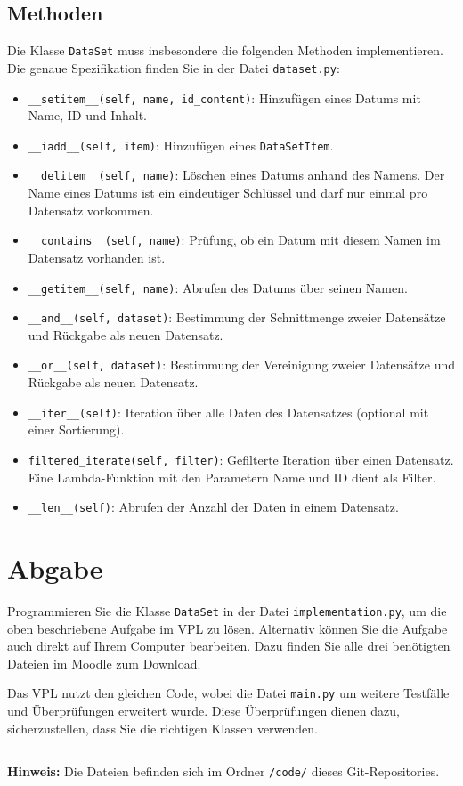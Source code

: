 \documentclass[12pt
a4paper,
parskip=full ]{article}
\begin{document}
\subsection{Methoden}
Die Klasse \texttt{DataSet} muss insbesondere die folgenden Methoden implementieren. Die genaue Spezifikation finden Sie in der Datei \texttt{dataset.py}:

\begin{itemize}
    \item \texttt{\_\_setitem\_\_(self, name, id\_content)}: Hinzuf\"ugen eines Datums mit Name, ID und Inhalt.
    \item \texttt{\_\_iadd\_\_(self, item)}: Hinzuf\"ugen eines \texttt{DataSetItem}.
    \item \texttt{\_\_delitem\_\_(self, name)}: L\"oschen eines Datums anhand des Namens. Der Name eines Datums ist ein eindeutiger Schl\"ussel und darf nur einmal pro Datensatz vorkommen.
    \item \texttt{\_\_contains\_\_(self, name)}: Pr\"ufung, ob ein Datum mit diesem Namen im Datensatz vorhanden ist.
    \item \texttt{\_\_getitem\_\_(self, name)}: Abrufen des Datums \"uber seinen Namen.
    \item \texttt{\_\_and\_\_(self, dataset)}: Bestimmung der Schnittmenge zweier Datens\"atze und R\"uckgabe als neuen Datensatz.
    \item \texttt{\_\_or\_\_(self, dataset)}: Bestimmung der Vereinigung zweier Datens\"atze und R\"uckgabe als neuen Datensatz.
    \item \texttt{\_\_iter\_\_(self)}: Iteration \"uber alle Daten des Datensatzes (optional mit einer Sortierung).
    \item \texttt{filtered\_iterate(self, filter)}: Gefilterte Iteration \"uber einen Datensatz. Eine Lambda-Funktion mit den Parametern Name und ID dient als Filter.
    \item \texttt{\_\_len\_\_(self)}: Abrufen der Anzahl der Daten in einem Datensatz.
\end{itemize}

\section{Abgabe}
Programmieren Sie die Klasse \texttt{DataSet} in der Datei \texttt{implementation.py}, um die oben beschriebene Aufgabe im VPL zu l\"osen. Alternativ k\"onnen Sie die Aufgabe auch direkt auf Ihrem Computer bearbeiten. Dazu finden Sie alle drei ben\"otigten Dateien im Moodle zum Download.

Das VPL nutzt den gleichen Code, wobei die Datei \texttt{main.py} um weitere Testf\"alle und \"Uberpr\"ufungen erweitert wurde. Diese \"Uberpr\"ufungen dienen dazu, sicherzustellen, dass Sie die richtigen Klassen verwenden.

\vspace{0.5cm}
\hrule
\vspace{0.2cm}
\noindent \textbf{Hinweis:} Die Dateien befinden sich im Ordner \texttt{/code/} dieses Git-Repositories.
\end{document}
